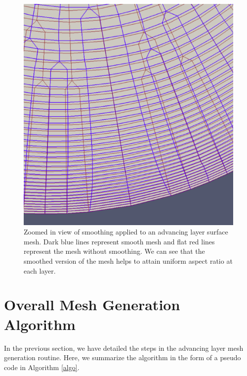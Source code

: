 \documentclass[conf]{new-aiaa}
\begin{document}
\begin{figure}
\centering
\includegraphics[scale=0.3]{smoothing/smoothing-comparison-cylinder-cap.eps}
\caption{Zoomed in view of smoothing applied to an advancing layer surface mesh. Dark blue lines represent smooth mesh and flat red lines represent the mesh without smoothing. We can see that the smoothed version of the mesh helps to attain uniform aspect ratio at each layer.}
\label{fig-smoothing-cylinder}
\end{figure}

\section{Overall Mesh Generation Algorithm}

In the previous section, we have detailed the steps in the advancing layer mesh generation routine. Here, we summarize the algorithm in the form of a pseudo code in Algorithm \ref{algo}.
\end{document}
